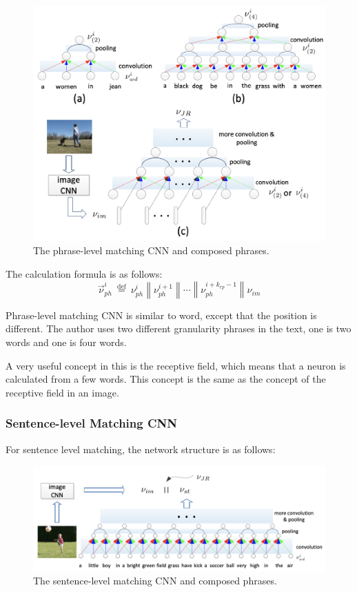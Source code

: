 \begin{figure}[h!]
\centering
\includegraphics[width=\textwidth]{mccns2.pdf}
\caption{ The phrase-level matching CNN and composed phrases. \cite{ma2015multimodal}}
\label{fig:mccns2}
\end{figure}

The calculation formula is as follows:
$$
\vec{\nu}_{p h}^{i} \stackrel{\text { def }}{=} \nu_{p h}^{i}\left\|\nu_{p h}^{i+1}\right\| \cdots\left\|\nu_{p h}^{i+k_{r p}-1}\right\| \nu_{i m}
$$

Phrase-level matching CNN is similar to word, except that the position is different. The author uses two different granularity phrases in the text, one is two words and one is four words.

A very useful concept in this is the receptive field, which means that a neuron is calculated from a few words. This concept is the same as the concept of the receptive field in an image.

\subsubsection{Sentence-level Matching CNN}
For sentence level matching, the network structure is as follows:

\begin{figure}[h!]
\centering
\includegraphics[width=\textwidth]{mcnns3.pdf}
\caption{The sentence-level matching CNN and composed phrases. \cite{ma2015multimodal}}
\label{fig:mccns3}
\end{figure}

